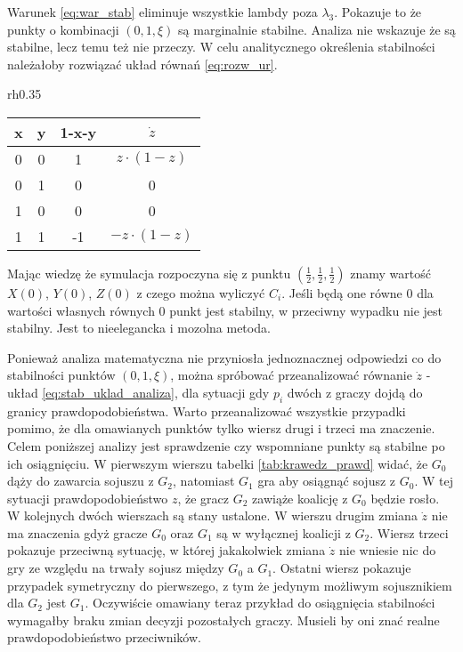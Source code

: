 Warunek \ref{eq:war_stab} eliminuje wszystkie lambdy poza $\lambda_3$. Pokazuje to że punkty o kombinacji $(0,1,\xi)$ są marginalnie stabilne. Analiza nie wskazuje że są stabilne, lecz temu też nie przeczy. W celu analitycznego określenia stabilności należałoby rozwiązać układ równań \ref{eq:rozw_ur}.

\begin{wraptable}{rh}{0.35\textwidth}
    \centering
    \caption{Stabilność na krawędzi sześcianu}
\label{tab:krawedz_prawd}
\begin{tabular}{c|c|c|c}
x & y & 1-x-y & $\dot{z}$       \\ \hline 
0 & 0 & 1     & $z \cdot (1-z)$  \\
0 & 1 & 0     & 0                \\
1 & 0 & 0     & 0                \\
1 & 1 & -1    & $-z \cdot (1-z)$
\end{tabular}
\end{wraptable}

Mając wiedzę że symulacja rozpoczyna się z punktu $(\frac{1}{2},\frac{1}{2},\frac{1}{2})$ znamy wartość $X(0)$, $Y(0)$, $Z(0)$ z czego można wyliczyć $C_i$. Jeśli będą one równe 0 dla wartości własnych równych 0 punkt jest stabilny, w przeciwny wypadku nie jest stabilny. Jest to nieelegancka i mozolna metoda.
 
Ponieważ analiza matematyczna nie przyniosła jednoznacznej odpowiedzi co do stabilności punktów $(0,1,\xi)$, można spróbować przeanalizować równanie $\dot{z}$ - układ \ref{eq:stab_uklad_analiza}, dla sytuacji gdy $p_i$ dwóch z graczy dojdą do granicy prawdopodobieństwa. Warto przeanalizować wszystkie przypadki pomimo, że dla omawianych punktów tylko wiersz drugi i trzeci ma znaczenie. Celem poniższej analizy jest sprawdzenie czy wspomniane punkty są stabilne po ich osiągnięciu.
W pierwszym wierszu tabelki \ref{tab:krawedz_prawd} widać, że $G_0$ dąży do zawarcia sojuszu z $G_2$, natomiast $G_1$ gra aby osiągnąć sojusz z $G_0$. W tej sytuacji prawdopodobieństwo $z$, że gracz $G_2$ zawiąże koalicję z $G_0$ będzie rosło. W kolejnych dwóch wierszach są stany ustalone. W wierszu drugim zmiana $\dot{z}$ nie ma znaczenia gdyż gracze $G_0$ oraz $G_1$ są w wyłącznej koalicji z $G_2$. Wiersz trzeci pokazuje przeciwną sytuację, w której jakakolwiek zmiana $\dot{z}$ nie wniesie nic do gry ze względu na trwały sojusz między $G_0$ a $G_1$. Ostatni wiersz pokazuje przypadek symetryczny do pierwszego, z tym że jedynym możliwym sojusznikiem dla $G_2$ jest $G_1$. Oczywiście omawiany teraz przykład do osiągnięcia stabilności wymagałby braku zmian decyzji pozostałych graczy. Musieli by oni znać realne prawdopodobieństwo przeciwników.